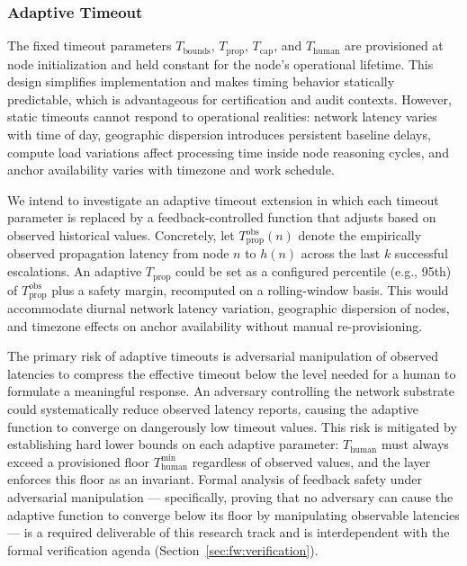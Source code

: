 \subsubsection{Adaptive Timeout}
\label{sec:fw:adaptive-timeout}

The fixed timeout parameters $T_{\text{bounds}}$, $T_{\text{prop}}$, $T_{\text{cap}}$, and $T_{\text{human}}$ are provisioned at node initialization and held constant for the node's operational lifetime. This design simplifies implementation and makes timing behavior statically predictable, which is advantageous for certification and audit contexts. However, static timeouts cannot respond to operational realities: network latency varies with time of day, geographic dispersion introduces persistent baseline delays, compute load variations affect processing time inside node reasoning cycles, and anchor availability varies with timezone and work schedule.

We intend to investigate an adaptive timeout extension in which each timeout parameter is replaced by a feedback-controlled function that adjusts based on observed historical values. Concretely, let $T_{\text{prop}}^{\text{obs}}(n)$ denote the empirically observed propagation latency from node $n$ to $h(n)$ across the last $k$ successful escalations. An adaptive $T_{\text{prop}}$ could be set as a configured percentile (e.g., 95th) of $T_{\text{prop}}^{\text{obs}}$ plus a safety margin, recomputed on a rolling-window basis. This would accommodate diurnal network latency variation, geographic dispersion of nodes, and timezone effects on anchor availability without manual re-provisioning.

The primary risk of adaptive timeouts is adversarial manipulation of observed latencies to compress the effective timeout below the level needed for a human to formulate a meaningful response. An adversary controlling the network substrate could systematically reduce observed latency reports, causing the adaptive function to converge on dangerously low timeout values. This risk is mitigated by establishing hard lower bounds on each adaptive parameter: $T_{\text{human}}$ must always exceed a provisioned floor $T_{\text{human}}^{\min}$ regardless of observed values, and the \fact{} layer enforces this floor as an invariant. Formal analysis of feedback safety under adversarial manipulation --- specifically, proving that no adversary can cause the adaptive function to converge below its floor by manipulating observable latencies --- is a required deliverable of this research track and is interdependent with the formal verification agenda (Section~\ref{sec:fw:verification}).

